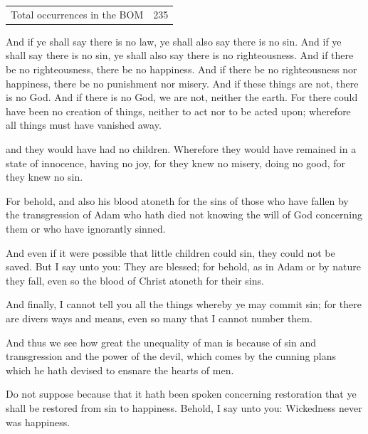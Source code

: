 		\begin{tabular}{ll}
			Total occurrences in the BOM & 235 %
		\end{tabular}
		
		\begin{compactdesc}
			\item[2 Nephi 2:13] And if ye shall say there is no law, ye shall also say there is no sin. And if ye shall say there is no sin, ye shall also say there is no righteousness. And if there be no righteousness, there be no happiness. And if there be no righteousness nor happiness, there be no punishment nor misery. And if these things are not, there is no God. And if there is no God, we are not, neither the earth. For there could have been no creation of things, neither to act nor to be acted upon; wherefore all things must have vanished away.
			\item[2 Nephi 2:23] and they would have had no children. Wherefore they would have remained in a state of innocence, having no joy, for they knew no misery, doing no good, for they knew no sin.
			\item[Mosiah 3:11] For behold, and also his blood atoneth for the sins of those who have fallen by the transgression of Adam who hath died not knowing the will of God concerning them or who have ignorantly sinned.
			\item[Mosiah 3:16] And even if it were possible that little children could sin, they could not be saved. But I say unto you: They are blessed; for behold, as in Adam or by nature they fall, even so the blood of Christ atoneth for their sins.
			\item[Mosiah 4:29] And finally, I cannot tell you all the things whereby ye may commit sin; for there are divers ways and means, even so many that I cannot number them.
			\item[Alma 28:13] And thus we see how great the unequality of man is because of sin and transgression and the power of the devil, which comes by the cunning plans which he hath devised to ensnare the hearts of men.
			\item[{\hyperref[ALMA-29-3]{Alma 29:3}}]
			\item[Alma 41:10] Do not suppose because that it hath been spoken concerning restoration that ye shall be restored from sin to happiness. Behold, I say unto you: Wickedness never was happiness.

\end{compactdesc}
